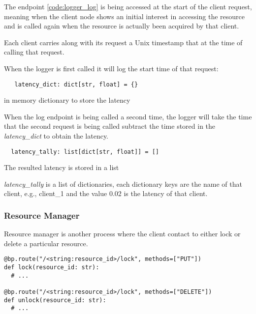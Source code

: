 The endpoint \ref{code:logger_log} is being accessed at the start of the client request, meaning 
when the client node shows an initial interest in accessing the resource and is called again when the
resource is actually been acquired by that client. 

Each client carries along with its request a Unix timestamp that at the time of calling 
that request. 


When the logger is first called it will log the start time of that request:

\begin{listing}[!ht]
  \begin{verbatim}
   latency_dict: dict[str, float] = {}
  \end{verbatim}
  \caption{in memory dictionary to store the latency}
  \label{code:latency_dict}
\end{listing}


When the log endpoint is being called a second time, the logger will take the time 
that the second request is being called subtract the time stored in the \textit{latency\_dict}
to obtain the latency.

\begin{listing}[!ht]
  \begin{verbatim}
  latency_tally: list[dict[str, float]] = []
  \end{verbatim}
  \caption{The resulted latency is stored in a list}
  \label{code:latency_tally}
\end{listing}

\textit{latency\_tally} is a list of dictionaries, each dictionary keys are the 
name of that client, e.g., client\_1 and the value 0.02 is the latency of that client.


\subsubsection{Resource Manager}
\label{subsubsec:resource_manager}

Resource manager is another process where the client contact to either lock or
delete a particular resource.

\begin{listing}[!ht]
  \begin{verbatim}
@bp.route("/<string:resource_id>/lock", methods=["PUT"])
def lock(resource_id: str):
  # ...

@bp.route("/<string:resource_id>/lock", methods=["DELETE"])
def unlock(resource_id: str):
  # ...
  \end{verbatim}
\end{listing}

